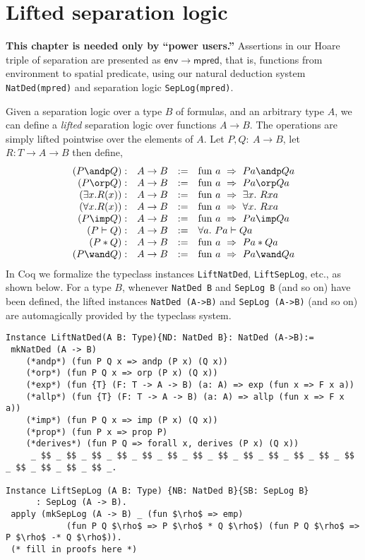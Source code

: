 \documentclass[12pt,fleqn,openany,oneside,showtrims]{memoir}
\newcommand{\ychapter}[2]{\chapter[#1]{#1}}
\begin{document}
\ychapter{Lifted separation logic}{(See PLCC \autoref{ch:lifted})}
\textbf{This chapter is needed only by ``power users.''}\newline
Assertions in our Hoare triple of separation
are presented as $\mathsf{env}\rightarrow
\mathsf{mpred}$, that is, functions from environment
to spatial predicate,
using our natural deduction system
\lstinline{NatDed(mpred)} and separation logic
\lstinline{SepLog(mpred)}.

Given a separation logic over a type $B$ of formulas,
and an arbitrary type $A$,
we can define a \emph{lifted} separation logic over functions $A \rightarrow B$.
The operations are simply lifted pointwise over the
elements of $A$.  Let $P,Q:~A\rightarrow B$,
let $R:T\rightarrow A \rightarrow B$ then define,
\[
\begin{array}{rccl}
(P \andp Q):& A\rightarrow B&:=& \mathrm{fun}~a~\Rightarrow~Pa \andp Qa\\
(P \orp Q):& A\rightarrow B&:=& \mathrm{fun}~a~\Rightarrow~Pa \orp Qa\\
(\exists x.R(x)):& A\rightarrow B&:=& \mathrm{fun}~a~\Rightarrow~\exists x.~Rxa\\
(\forall x.R(x)):& A\rightarrow B&:=& \mathrm{fun}~a~\Rightarrow~\forall x.~Rxa\\
(P \imp Q):& A\rightarrow B&:=& \mathrm{fun}~a~\Rightarrow~Pa \imp Qa\\
(P \vdash Q):& A\rightarrow B&:=& \forall a.~Pa \vdash Qa\\
(P * Q):& A\rightarrow B&:=& \mathrm{fun}~a~\Rightarrow~Pa * Qa\\
(P \wand Q):& A\rightarrow B&:=& \mathrm{fun}~a~\Rightarrow~Pa \wand Qa\\
\end{array}
\]
In Coq we formalize the typeclass instances
\lstinline{LiftNatDed},
\lstinline{LiftSepLog}, etc.,
as shown below.
For a type $B$, whenever \lstinline{NatDed B} and \lstinline{SepLog B} (and so on) have been defined, the lifted instances
\lstinline{NatDed (A->B)} and \lstinline{SepLog (A->B)} (and so on)
are automagically provided by the typeclass system.

\begin{lstlisting}
Instance LiftNatDed(A B: Type){ND: NatDed B}: NatDed (A->B):=
 mkNatDed (A -> B)
    (*andp*) (fun P Q x => andp (P x) (Q x))
    (*orp*) (fun P Q x => orp (P x) (Q x))
    (*exp*) (fun {T} (F: T -> A -> B) (a: A) => exp (fun x => F x a))
    (*allp*) (fun {T} (F: T -> A -> B) (a: A) => allp (fun x => F x a))
    (*imp*) (fun P Q x => imp (P x) (Q x))
    (*prop*) (fun P x => prop P)
    (*derives*) (fun P Q => forall x, derives (P x) (Q x))
     _ $$ _ $$ _ $$ _ $$ _ $$ _ $$ _ $$ _ $$ _ $$ _ $$ _ $$ _ $$ _ $$ _ $$ _ $$ _ $$ _ $$ _.

Instance LiftSepLog (A B: Type) {NB: NatDed B}{SB: SepLog B}
      : SepLog (A -> B).
 apply (mkSepLog (A -> B) _ (fun $\rho$ => emp)
            (fun P Q $\rho$ => P $\rho$ * Q $\rho$) (fun P Q $\rho$ => P $\rho$ -* Q $\rho$)).
 (* fill in proofs here *)
\end{lstlisting}
\end{document}

